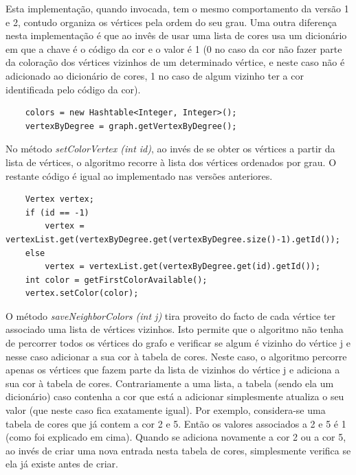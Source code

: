 \documentclass[a4paper,12pt]{report}
\begin{document}
Esta implementação, quando invocada, tem o mesmo comportamento da versão 1 e 2, contudo organiza os vértices pela ordem do seu grau. Uma outra diferença nesta implementação é que ao invês de usar uma lista de cores usa um dicionário em que a chave é o código da cor e o valor é 1 (0 no caso da cor não fazer parte da coloração dos vértices vizinhos de um determinado vértice, e neste caso não é adicionado ao dicionário de cores, 1 no caso de algum vizinho ter a cor identificada pelo código da cor).

\begin{lstlisting}
    colors = new Hashtable<Integer, Integer>();
    vertexByDegree = graph.getVertexByDegree();
\end{lstlisting}

No método \textit{setColorVertex (int id)}, ao invés de se obter os vértices a partir da lista de vértices, o algoritmo recorre à lista dos vértices ordenados por grau. O restante código é igual ao implementado nas versões anteriores.

\begin{lstlisting}
    Vertex vertex;
    if (id == -1)   
        vertex = vertexList.get(vertexByDegree.get(vertexByDegree.size()-1).getId());
    else
        vertex = vertexList.get(vertexByDegree.get(id).getId());
    int color = getFirstColorAvailable();
    vertex.setColor(color);
\end{lstlisting}

O método \textit{saveNeighborColors (int j)} tira proveito do facto de cada vértice ter associado uma lista de vértices vizinhos. Isto permite que o algoritmo não tenha de percorrer todos os vértices do grafo e verificar se algum é vizinho do vértice j e nesse caso adicionar a sua cor à tabela de cores. Neste caso, o algoritmo percorre apenas os vértices que fazem parte da lista de vizinhos do vértice j e adiciona a sua cor à tabela de cores.
Contrariamente a uma lista, a tabela (sendo ela um dicionário) caso contenha a cor que está a adicionar simplesmente atualiza o seu valor (que neste caso fica exatamente igual). Por exemplo, considera-se uma tabela de cores que já contem a cor 2 e 5. Então os valores associados a 2 e 5 é 1 (como foi explicado em cima). Quando se adiciona novamente a cor 2 ou a cor 5, ao invés de criar uma nova entrada nesta tabela de cores, simplesmente verifica se ela já existe antes de criar.
\end{document}

